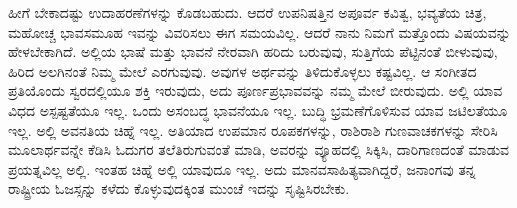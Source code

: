 \vskip   2pt

ಹೀಗೆ ಬೇಕಾದಷ್ಟು ಉದಾಹರಣೆಗಳನ್ನು ಕೊಡಬಹುದು. ಆದರೆ ಉಪನಿಷತ್ತಿನ ಅಪೂರ್ವ ಕವಿತ್ವ, ಭವ್ಯತೆಯ ಚಿತ್ರ, ಮಹೋಚ್ಚ ಭಾವಸಮೂಹ ಇವನ್ನು ವಿವರಿಸಲು ಈಗ ಸಮಯವಿಲ್ಲ. ಆದರೆ ನಾನು ನಿಮಗೆ ಮತ್ತೊಂದು ವಿಷಯವನ್ನು ಹೇಳಬೇಕಾಗಿದೆ. ಅಲ್ಲಿಯ ಭಾಷೆ ಮತ್ತು ಭಾವನೆ ನೇರವಾಗಿ ಹರಿದು ಬರುವುವು, ಸುತ್ತಿಗೆಯ ಪೆಟ್ಟಿನಂತೆ ಬೀಳುವುವು, ಹಿರಿದ ಅಲಗಿನಂತೆ ನಿಮ್ಮ ಮೇಲೆ ಎರಗುವುವು. ಅವುಗಳ ಅರ್ಥವನ್ನು ತಿಳಿದುಕೊಳ್ಳಲು ಕಷ್ಟವಿಲ್ಲ. ಆ ಸಂಗೀತದ ಪ್ರತಿಯೊಂದು ಸ್ವರದಲ್ಲಿಯೂ ಶಕ್ತಿ ಇರುವುದು, ಅದು ಪೂರ್ಣಪ್ರಭಾವವನ್ನು ನಮ್ಮ ಮೇಲೆ ಬೀರುವುದು. ಅಲ್ಲಿ ಯಾವ ವಿಧದ ಅಸ್ಪಷ್ಟತೆಯೂ ಇಲ್ಲ. ಒಂದು ಅಸಂಬದ್ಧ ಭಾವನೆಯೂ ಇಲ್ಲ. ಬುದ್ಧಿ ಭ್ರಮಣೆಗೊಳಿಸುವ ಯಾವ ಜಟಿಲತೆಯೂ ಇಲ್ಲ. ಅಲ್ಲಿ ಅವನತಿಯ ಚಿಹ್ನೆ ಇಲ್ಲ. ಅತಿಯಾದ ಉಪಮಾನ ರೂಪಕಗಳನ್ನು, ರಾಶಿರಾಶಿ ಗುಣವಾಚಕಗಳನ್ನು ಸೇರಿಸಿ ಮೂಲಾರ್ಥವನ್ನೇ ಕೆಡಿಸಿ ಓದುಗರ ತಲೆತಿರುಗುವಂತೆ ಮಾಡಿ, ಅವರನ್ನು ವ್ಯೂಹದಲ್ಲಿ ಸಿಕ್ಕಿಸಿ, ದಾರಿಗಾಣದಂತೆ ಮಾಡುವ ಪ್ರಯತ್ನವಿಲ್ಲ ಅಲ್ಲಿ. ಇಂತಹ ಚಿಹ್ನೆ ಅಲ್ಲಿ ಯಾವುದೂ ಇಲ್ಲ. ಅದು ಮಾನವಸಾಹಿತ್ಯವಾಗಿದ್ದರೆ, ಜನಾಂಗವು ತನ್ನ ರಾಷ್ಟ್ರೀಯ ಓಜಸ್ಸನ್ನು ಕಳೆದು ಕೊಳ್ಳುವುದಕ್ಕಿಂತ ಮುಂಚೆ ಇದನ್ನು ಸೃಷ್ಟಿಸಿರಬೇಕು.

\vskip   2pt


